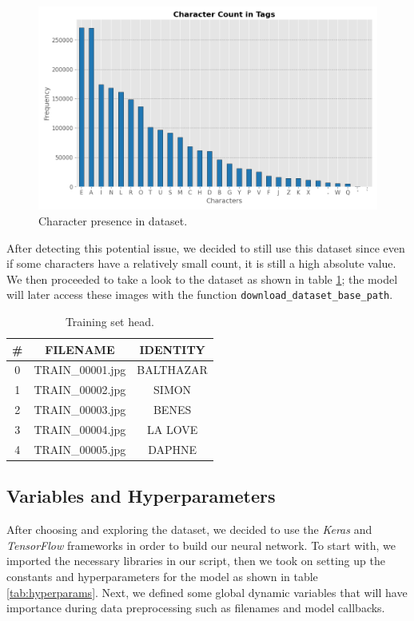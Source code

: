 \documentclass[11pt,letterpaper]{article}
\begin{document}
	\begin{figure}[h]
		\centering
		\includegraphics[width=0.65\linewidth]{character_count.png}
		\caption{Character presence in dataset.}
		\label{fig:char_freq}
	\end{figure}
	
	After detecting this potential issue, we decided to still use this dataset since even if some characters have a relatively small count, it is still a high absolute value. We then proceeded to take a look to the dataset as shown in table \ref{tab:dataset}; the model will later access these images with the function \texttt{download\_dataset\_base\_path}.
	
	\begin{table}[h]
		\centering
		\begin{tabular}{|c|c|c|}
			\hline
			\# & FILENAME & IDENTITY \\
			\hline
			0 & TRAIN\_00001.jpg & BALTHAZAR \\
			\hline
			1 & TRAIN\_00002.jpg & SIMON \\
			\hline
			2 & TRAIN\_00003.jpg & BENES \\
			\hline
			3 & TRAIN\_00004.jpg & LA LOVE \\
			\hline
			4 & TRAIN\_00005.jpg & DAPHNE \\
			\hline
		\end{tabular}
		\caption{Training set head.}
		\label{tab:dataset}
	\end{table}
	
	\subsection{Variables and Hyperparameters}
	After choosing and exploring the dataset, we decided to use the \textit{Keras} and \textit{TensorFlow} frameworks in order to build our neural network. To start with, we imported the necessary libraries in our script, then we took on setting up the constants and hyperparameters for the model as shown in table \ref{tab:hyperparams}. Next, we defined some global dynamic variables that will have importance during data preprocessing such as filenames and model callbacks.
	
\end{document}
